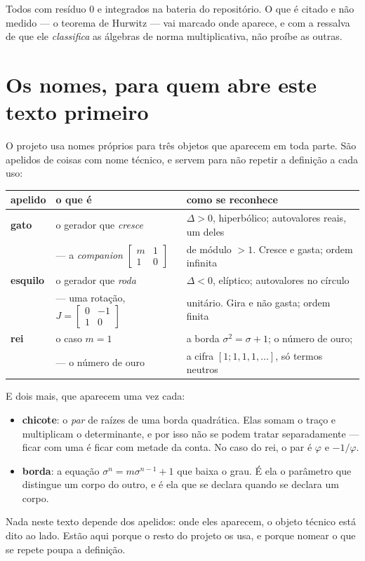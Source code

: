 \documentclass[11pt]{article}
\theoremstyle{plain}
\theoremstyle{remark}
\begin{document}
\noindent Todos com resíduo $0$ e integrados na bateria do repositório. O que é citado e não
medido --- o teorema de Hurwitz --- vai marcado onde aparece, e com a ressalva de que ele
\emph{classifica} as álgebras de norma multiplicativa, não proíbe as outras.

\appendix
\section{Os nomes, para quem abre este texto primeiro}

O projeto usa nomes próprios para três objetos que aparecem em toda parte. São apelidos de coisas
com nome técnico, e servem para não repetir a definição a cada uso:

\begin{center}
\begin{tabular}{lll}
\toprule
\textbf{apelido} & \textbf{o que é} & \textbf{como se reconhece} \\
\midrule
\textbf{gato} & o gerador que \emph{cresce} & $\Delta>0$, hiperbólico; autovalores reais, um deles \\
 & --- a \emph{companion} $\left[\begin{smallmatrix}m&1\\1&0\end{smallmatrix}\right]$
 & de módulo $>1$. Cresce e gasta; ordem infinita \\[3pt]
\textbf{esquilo} & o gerador que \emph{roda} & $\Delta<0$, elíptico; autovalores no círculo \\
 & --- uma rotação, $J=\left[\begin{smallmatrix}0&-1\\1&0\end{smallmatrix}\right]$
 & unitário. Gira e não gasta; ordem finita \\[3pt]
\textbf{rei} & o caso $m=1$ & a borda $\sigma^2=\sigma+1$; o número de ouro; \\
 & --- o número de ouro & a cifra $[1;1,1,1,\dots]$, só termos neutros \\
\bottomrule
\end{tabular}
\end{center}

\noindent E dois mais, que aparecem uma vez cada:

\begin{itemize}
\item \textbf{chicote}: o \emph{par} de raízes de uma borda quadrática. Elas somam o traço e
multiplicam o determinante, e por isso não se podem tratar separadamente --- ficar com uma é ficar
com metade da conta. No caso do rei, o par é $\varphi$ e $-1/\varphi$.
\item \textbf{borda}: a equação $\sigma^n=m\sigma^{n-1}+1$ que baixa o grau. É ela o parâmetro
que distingue um corpo do outro, e é ela que se declara quando se declara um corpo.
\end{itemize}

\noindent Nada neste texto depende dos apelidos: onde eles aparecem, o objeto técnico está dito ao
lado. Estão aqui porque o resto do projeto os usa, e porque nomear o que se repete poupa a
definição.
\end{document}
